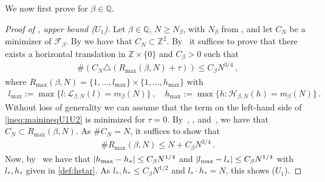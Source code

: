 \documentclass[reqno]{amsart}
\theoremstyle{plain}
\theoremstyle{definition}
\numberwithin{equation}{section}
\begin{document}
 We now first prove  for $\beta \in \mathbb{Q}$. 

\begin{proof}[Proof of ,  upper bound  {\rm ($U_1$)}]
  Let  $\beta \in \mathbb{Q}$,  $N\geq N_\beta$,  with $N_\beta$ from
  ,  and let $C_N$ be a minimizer of
  $\mathcal{F}_\beta$. By  we have that $C_N
  \subset \mathbb{Z}^2$.  By~ it suffices to
  prove that there exists a horizontal translation in $\mathbb{Z} \times \{0\}$ and   $C_\beta >0$  such that
\begin{align}\label{ineq:mainineqU1U2}
\#\left(C_{N}  \triangle \left(R_{\max}(\beta,N) +\tau\right)\right) \leq  C_\beta N^{3/4} \,,
\end{align}
where $R_{\max}(\beta,N) =\{1,\ldots,l_{\max}\}\times \{1,\ldots,h_{\max}\}$ with   
\begin{align*}
l_{\max}:= \max\{l \colon \mathcal{L}_{\beta,N}(l) =m_\beta(N)\}\,, \quad h_{\max}:= \max\{h \colon \mathcal{H}_{\beta,N}(h) =m_\beta(N)\}\,.
\end{align*}
Without loss of generality we can assume that the term on the
left-hand side of \eqref{ineq:mainineqU1U2} is minimized    for $\tau=0$. By~, , and~, we have that $C_N \subset R_{\max}(\beta,N)$.  As $\# C_N=N$, it suffices to show that
\begin{align*}
\#R_{\max}(\beta,N) \leq N+C_\beta N^{3/4}\,.
\end{align*}
Now,  by~ we have that $| h_{\rm max}  -h_*| \leq C_\beta N^{1/4}$ and  $ | l_{\rm max}  -l_*|\leq C_\beta N^{1/4} $ with $l_*,h_*$ given in \eqref{def:hstar}. As $l_*,h_* \leq C_\beta N^{1/2}$ and $l_*\cdot h_*=N$, this shows {\rm ($U_1$)}. 
\end{proof}
\end{document}

